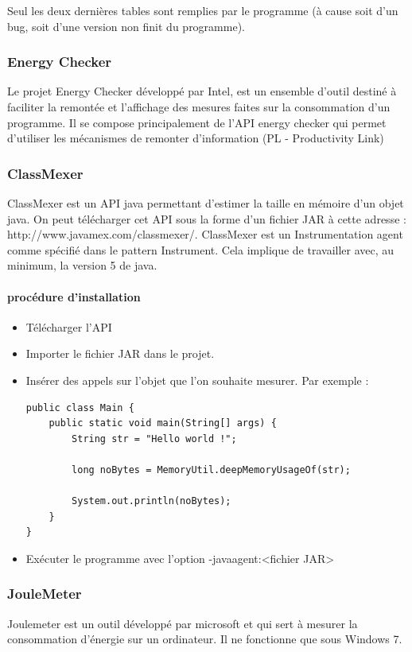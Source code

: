\documentclass[a4paper, 11pt]{report}
\begin{document}
Seul les deux dernières tables sont remplies par le programme (à cause soit d’un bug, soit d’une version non finit du programme).

\subsubsection{Energy Checker}
Le projet Energy Checker développé par Intel, est un ensemble d’outil destiné à faciliter la remontée et l’affichage des mesures faites sur la consommation d’un programme. Il se compose principalement de l’API energy checker qui permet d’utiliser les mécanismes de remonter d’information (PL - Productivity Link)

\subsubsection{ClassMexer}
ClassMexer est un API java permettant d’estimer la taille en mémoire d’un objet java. On peut télécharger cet API sous la forme d’un fichier JAR à cette adresse : http://www.javamex.com/classmexer/. ClassMexer est un Instrumentation agent comme spécifié dans le pattern Instrument. Cela implique de travailler avec, au minimum, la version 5 de java.

\paragraph{procédure d'installation}
\begin{itemize}
	\item Télécharger l’API
	\item Importer le fichier JAR dans le projet.
	\item Insérer des appels sur l’objet que l’on souhaite mesurer. Par exemple :
\begin{verbatim}
public class Main {
	public static void main(String[] args) {
		String str = "Hello world !";
		
		long noBytes = MemoryUtil.deepMemoryUsageOf(str);
		
		System.out.println(noBytes);
	}
}
\end{verbatim}
	\item Exécuter le programme avec l’option -javaagent:<fichier JAR>
\end{itemize}

\subsubsection{JouleMeter}
Joulemeter est un outil développé par microsoft et qui sert à mesurer la consommation d’énergie sur un ordinateur. Il ne fonctionne que sous Windows 7.
\end{document}

